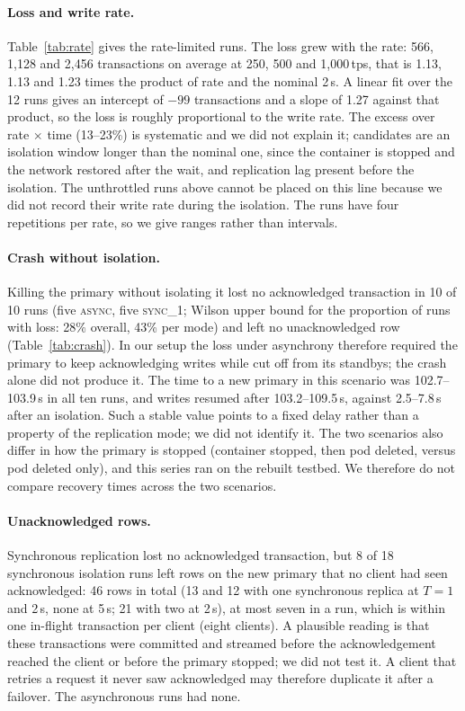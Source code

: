 \documentclass[preprint,12pt]{elsarticle}
\begin{document}
\paragraph{Loss and write rate.} Table~\ref{tab:rate} gives the rate-limited runs. The loss grew with the rate: 566, 1,128 and 2,456 transactions on average at 250, 500 and 1,000\,tps, that is 1.13, 1.13 and 1.23 times the product of rate and the nominal 2\,s. A linear fit over the 12 runs gives an intercept of $-99$ transactions and a slope of 1.27 against that product, so the loss is roughly proportional to the write rate. The excess over rate $\times$ time (13--23\%) is systematic and we did not explain it; candidates are an isolation window longer than the nominal one, since the container is stopped and the network restored after the wait, and replication lag present before the isolation. The unthrottled runs above cannot be placed on this line because we did not record their write rate during the isolation. The runs have four repetitions per rate, so we give ranges rather than intervals.

\paragraph{Crash without isolation.} Killing the primary without isolating it lost no acknowledged transaction in 10 of 10 runs (five \textsc{async}, five \textsc{sync\_1}; Wilson upper bound for the proportion of runs with loss: 28\% overall, 43\% per mode) and left no unacknowledged row (Table~\ref{tab:crash}). In our setup the loss under asynchrony therefore required the primary to keep acknowledging writes while cut off from its standbys; the crash alone did not produce it. The time to a new primary in this scenario was 102.7--103.9\,s in all ten runs, and writes resumed after 103.2--109.5\,s, against 2.5--7.8\,s after an isolation. Such a stable value points to a fixed delay rather than a property of the replication mode; we did not identify it. The two scenarios also differ in how the primary is stopped (container stopped, then pod deleted, versus pod deleted only), and this series ran on the rebuilt testbed. We therefore do not compare recovery times across the two scenarios.

\paragraph{Unacknowledged rows.} Synchronous replication lost no acknowledged transaction, but 8 of 18 synchronous isolation runs left rows on the new primary that no client had seen acknowledged: 46 rows in total (13 and 12 with one synchronous replica at $T=1$ and 2\,s, none at 5\,s; 21 with two at 2\,s), at most seven in a run, which is within one in-flight transaction per client (eight clients). A plausible reading is that these transactions were committed and streamed before the acknowledgement reached the client or before the primary stopped; we did not test it. A client that retries a request it never saw acknowledged may therefore duplicate it after a failover. The asynchronous runs had none.
\end{document}
